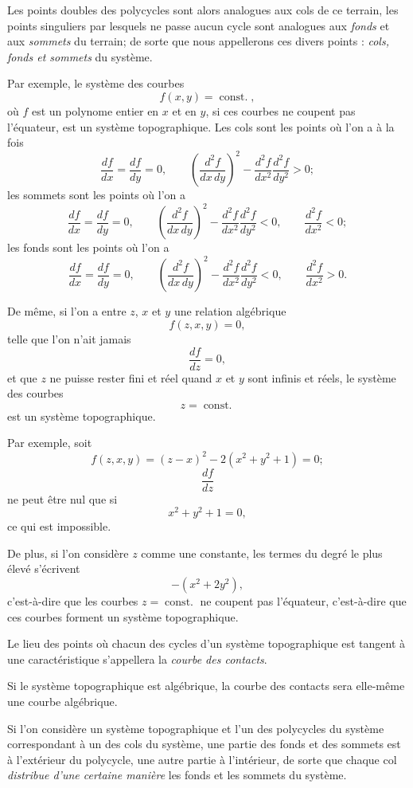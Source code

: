 \documentclass[11pt]{article}
\begin{document}
Les points doubles des polycycles sont alors analogues aux cols de ce terrain, les points singuliers par lesquels ne passe aucun cycle sont analogues aux \emph{fonds} et aux \emph{sommets} du terrain; de sorte que nous appellerons ces divers points : \emph{cols, fonds et sommets} du système.

Par exemple, le système des courbes
\[
f(x,y)=\operatorname{const.},
\]
où $f$ est un polynome entier en $x$ et en $y$, si ces courbes ne coupent pas l’équateur, est un système topographique. Les cols sont les points où l’on a à la fois
\[
\frac{df}{dx}=\frac{df}{dy}=0,
\qquad
\left(\frac{d^2f}{dx\,dy}\right)^2-\frac{d^2f}{dx^2}\frac{d^2f}{dy^2}>0;
\]
les sommets sont les points où l’on a
\[
\frac{df}{dx}=\frac{df}{dy}=0,
\qquad
\left(\frac{d^2f}{dx\,dy}\right)^2-\frac{d^2f}{dx^2}\frac{d^2f}{dy^2}<0,
\qquad
\frac{d^2f}{dx^2}<0;
\]
les fonds sont les points où l’on a
\[
\frac{df}{dx}=\frac{df}{dy}=0,
\qquad
\left(\frac{d^2f}{dx\,dy}\right)^2-\frac{d^2f}{dx^2}\frac{d^2f}{dy^2}<0,
\qquad
\frac{d^2f}{dx^2}>0.
\]

De même, si l’on a entre $z$, $x$ et $y$ une relation algébrique
\[
f(z,x,y)=0,
\]
telle que l’on n’ait jamais
\[
\frac{df}{dz}=0,
\]
et que $z$ ne puisse rester fini et réel quand $x$ et $y$ sont infinis et réels, le système des courbes
\[
z=\operatorname{const.}
\]
est un système topographique.

Par exemple, soit
\[
f(z,x,y)=(z-x)^2-2(x^2+y^2+1)=0;
\]
\[
\frac{df}{dz}
\]
ne peut être nul que si
\[
x^2+y^2+1=0,
\]
ce qui est impossible.

De plus, si l’on considère $z$ comme une constante, les termes du degré le plus élevé s’écrivent
\[
-(x^2+2y^2),
\]
c’est-à-dire que les courbes $z=\operatorname{const.}$ ne coupent pas l’équateur, c’est-à-dire que ces courbes forment un système topographique.

Le lieu des points où chacun des cycles d’un système topographique est tangent à une caractéristique s’appellera la \emph{courbe des contacts}.

Si le système topographique est algébrique, la courbe des contacts sera elle-même une courbe algébrique.

Si l’on considère un système topographique et l’un des polycycles du système correspondant à un des cols du système, une partie des fonds et des sommets est à l’extérieur du polycycle, une autre partie à l’intérieur, de sorte que chaque col \emph{distribue d’une certaine manière} les fonds et les sommets du système.
\end{document}
